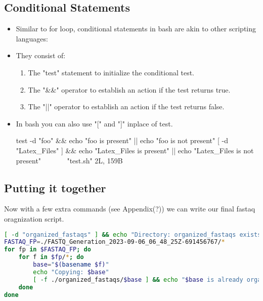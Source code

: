 \documentclass{article}
\begin{document}
\subsection*{Conditional Statements}
\begin{itemize}
	\item Similar to for loop, conditional statements in bash are akin to other scripting languages:
	\item They consist of:
	\begin{enumerate}
		\item The "test" statement to initialize the conditional test.
		\item The "\&\&" operator to establish an action if the test returns true.
		\item The "||" operator to establish an action if the test returns false.
	\end{enumerate}
	\item In bash you can also use "[" and "]" inplace of test.
	\begin{vim}
	test -d "foo" && echo "foo is present" || echo "foo is not present"	
	[ -d "Latex_Files" ] && echo "Latex_Files is present" || echo "Latex_Files is not present"
	~
	~
	~
	~
	"test.sh" 2L, 159B
	\end{vim}
\end{itemize}
\subsection*{Putting it together}
Now with a few extra commands (see Appendix(?)) we can write our final fastaq oragnization script.


\begin{file}
\begin{lstlisting}[language=bash, 
	basicstyle=\ttfamily\small,
	breaklines=true,tabsize=2,
	postbreak=\mbox{\textcolor{red}{$\hookrightarrow$}\space},]
[ -d "organized_fastaqs" ] && echo "Directory: organized_fastaqs exists" || mkdir organized_fastaqs 
FASTAQ_FP=./FASTQ_Generation_2023-09-06_06_48_25Z-691456767/*
for fp in $FASTAQ_FP; do
	for f in $fp/*; do
		base="$(basename $f)"
		echo "Copying: $base"
		[ -f ./organized_fastaqs/$base ] && echo "$base is already organized!" ||  cp $f ./organized_fastaqs/$base
	done
done
\end{lstlisting}
\end{file}
\end{document}
